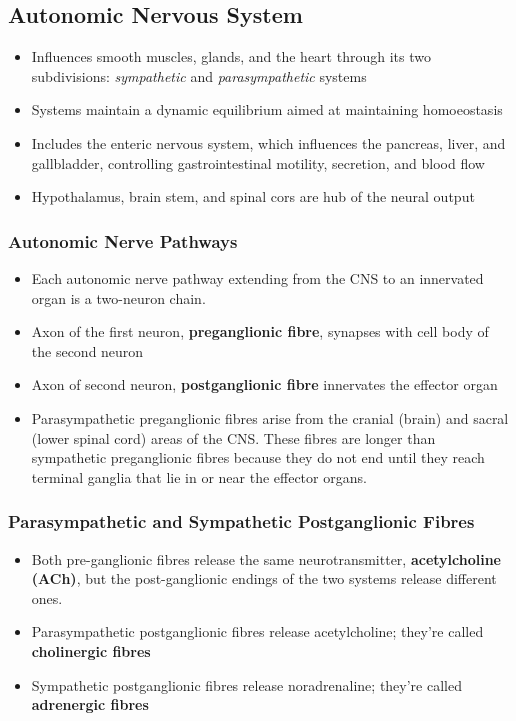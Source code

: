\documentclass[11pt]{article}
\begin{document}
\subsection{Autonomic Nervous System}
\begin{itemize}
\item Influences smooth muscles, glands, and the heart through its two subdivisions: \textit{sympathetic} and \textit{parasympathetic} systems 
\item Systems maintain a dynamic equilibrium aimed at maintaining homoeostasis
\item Includes the enteric nervous system, which influences the pancreas, liver, and gallbladder, controlling gastrointestinal  motility, secretion, and blood flow
\item Hypothalamus, brain stem, and spinal cors are hub of the neural output
\end{itemize}

\subsubsection{Autonomic Nerve Pathways}
\begin{itemize}
\item Each autonomic nerve pathway extending from the CNS to an innervated organ is a two-neuron chain.
\item Axon of the first neuron, \textbf{preganglionic fibre}, synapses with cell body of the second neuron
\item Axon of second neuron, \textbf{postganglionic fibre} innervates the effector organ
\item Parasympathetic preganglionic fibres arise from the cranial (brain) and sacral (lower spinal cord) areas of the CNS. These fibres are longer than sympathetic preganglionic fibres because they do not end until they reach terminal ganglia that lie in or near the effector organs. 
\end{itemize}


\subsubsection{Parasympathetic and Sympathetic Postganglionic Fibres}
\begin{itemize}
\item Both pre-ganglionic  fibres release the same neurotransmitter, \textbf{acetylcholine (ACh)}, but the post-ganglionic endings of the two systems release different ones.
\item Parasympathetic postganglionic fibres release acetylcholine; they're called \textbf{cholinergic fibres} 
\item Sympathetic postganglionic fibres release noradrenaline; they're called \textbf{adrenergic fibres} 
\end{itemize}
\end{document}
